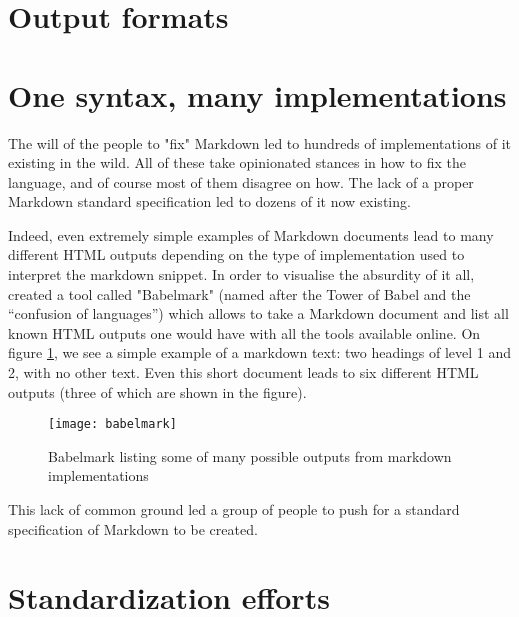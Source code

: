\section{Output formats}


\newpage

\section{One syntax, many implementations}

The will of the people to "fix" Markdown led to hundreds of implementations of it existing in the wild. All of these take opinionated stances
in how to fix the language, and of course most of them disagree on how. The lack of a proper Markdown standard specification led to dozens of
it now existing.\newline

Indeed, even extremely simple examples of Markdown documents lead to many different HTML outputs depending on the type of implementation used
to interpret the markdown snippet. In order to visualise the absurdity of it all, \citeauthor{babelmark} created a tool called "Babelmark"
(named after the Tower of Babel and the ``confusion of languages'') which allows to take a Markdown document and list all known HTML outputs
one would have with all the tools available online. On figure \ref{fig:babelmark}, we see a simple example of a markdown text: two headings of
level 1 and 2, with no other text. Even this short document leads to six different HTML outputs (three of which are shown in the figure).

\begin{figure}[H]
\centering
\texttt{[image: babelmark]}
\caption{Babelmark listing some of many possible outputs from markdown implementations}
\label{fig:babelmark}
\end{figure}

This lack of common ground led a group of people to push for a standard specification of Markdown to be created.

\section{Standardization efforts}

\cite{leonard2016text}

\cite{commonmark}